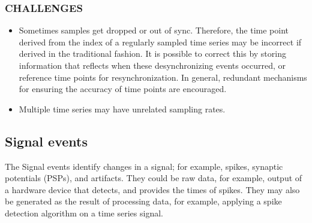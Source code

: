 \documentclass[letterpaper, 10 pt, conference]{ieeeconf}  \IEEEoverridecommandlockouts                              \overrideIEEEmargins
\begin{document}
\subsubsection*{CHALLENGES}
\begin{itemize}
\item Sometimes samples get dropped or out of sync.  Therefore, the time point derived from the index of a regularly sampled time series may be incorrect if derived in the traditional fashion.  It is possible to correct this by storing information that reflects when these desynchronizing events occurred, or reference time points for resynchronization.  In general, redundant mechanisms for ensuring the accuracy of time points are encouraged.  
\item Multiple time series may have unrelated sampling rates. 
\end{itemize}

\subsection{Signal events}
The Signal events identify changes in a signal; for example, spikes, synaptic potentials (PSPs), and artifacts.  They could be raw data, for example, output of a hardware device that detects, and provides the times of spikes. They may also be generated as the result of processing data, for example, applying a spike detection algorithm on a time series signal.
\smallskip
\smallskip
\end{document}
